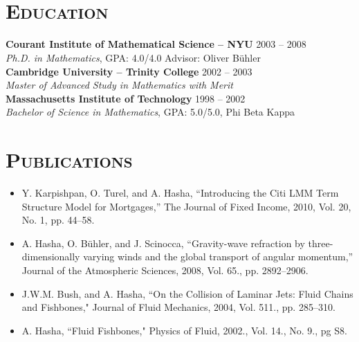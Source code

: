 \begin{resume}
\begin{formatb}
  \\
  \body\\
\end{formatb}

\section{\textsc{Education}}

\textbf{Courant Institute of Mathematical Science -- NYU} \hfill 2003 -- 2008 \\
\textit{Ph.D. in Mathematics}, GPA: 4.0/4.0 \hfill Advisor: Oliver B\"uhler \\
\newline
\textbf{Cambridge University -- Trinity College} \hfill 2002 -- 2003 \\ 
\textit{Master of Advanced Study in Mathematics with Merit} \\
\newline
\textbf{Massachusetts Institute of Technology} \hfill 1998 -- 2002 \\
\textit{Bachelor of Science in Mathematics}, GPA: 5.0/5.0, Phi Beta Kappa\\

\section{\textsc{Publications}}
\begin{itemize}
\item Y. Karpishpan, O. Turel, and A. Hasha, ``Introducing the Citi LMM Term Structure Model for Mortgages,''
The Journal of Fixed Income, 2010, Vol. 20, No. 1, pp. \mbox{44--58}.
\item A. Hasha, O. B\"uhler, and J. Scinocca,  ``Gravity-wave refraction by three-dimensionally 
varying winds and the global transport of angular momentum,''  
Journal of the Atmospheric Sciences, 2008, Vol. 65., pp.
\mbox{2892--2906}.
\item J.W.M. Bush, and A. Hasha, ``On the Collision of Laminar Jets:  Fluid Chains and Fishbones,"  Journal of Fluid Mechanics, 2004, Vol. 511., pp. 285--310.
\item A. Hasha, ``Fluid Fishbones," Physics of Fluid, 2002., Vol. 14., No. 9., pg S8.
\end{itemize}


\end{resume}

